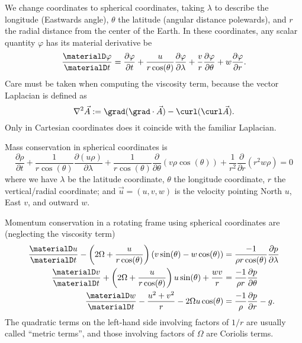 We change coordinates to spherical coordinates, taking $\lambda$ to
describe the longitude (Eastwards angle), $\theta$ the latitude (angular
distance polewards), and $r$ the radial distance from the center of the
Earth. In these coordinates, any scalar quantity $\varphi$ has its
material derivative be
\begin{equation}
  \frac{\materialD\varphi}{\materialD t}
  = \frac{\partial\varphi}{\partial t}
    + \frac{u}{r\cos(\theta)}\frac{\partial\varphi}{\partial\lambda}
    + \frac{v}{r}\frac{\partial\varphi}{\partial\theta}
    + w\frac{\partial\varphi}{\partial r}.
\end{equation}
Care must be taken when computing the viscosity term, because the vector
Laplacian is defined as
\begin{equation}
  \nabla^{2}\vec{A} := \grad(\grad\cdot\vec{A}) - \curl(\curl\vec{A}).
\end{equation}
Only in Cartesian coordinates does it coincide with the familiar Laplacian.

\begin{prop}
  Mass conservation in spherical coordinates is
  \begin{equation}
    \frac{\partial\rho}{\partial t}
    + \frac{1}{r\cos(\theta)}\frac{\partial(u\rho)}{\partial\lambda}
    + \frac{1}{r\cos(\theta)}\frac{\partial}{\partial\theta}(v\rho\cos(\theta))
    + \frac{1}{r^{2}}\frac{\partial}{\partial r}(r^{2}w\rho)
    = 0
  \end{equation}
  where we have $\lambda$ be the latitude coordinate, $\theta$ the
  longitude coordinate, $r$ the vertical/radial coordinate; and
  $\vec{u}=(u,v,w)$ is the velocity pointing North $u$, East $v$, and
  outward $w$.
\end{prop}

\begin{prop}
  Momentum conservation in a rotating frame using spherical coordinates
  are (neglecting the viscosity term)
  \begin{subequations}
    \begin{align}
      \frac{\materialD u}{\materialD t} -\left(2\Omega + \frac{u}{r\cos(\theta)}\right)(v\sin(\theta)-w\cos(\theta))
      &= \frac{-1}{\rho r\cos(\theta)}\frac{\partial p}{\partial\lambda}\\
      \frac{\materialD v}{\materialD t} +\left(2\Omega + \frac{u}{r\cos(\theta)}\right)u\sin(\theta)
      + \frac{wv}{r}
      &= \frac{-1}{\rho r}\frac{\partial p}{\partial\theta} \\
      \frac{\materialD w}{\materialD t} - \frac{u^{2}+v^{2}}{r} -
      2\Omega u\cos(\theta)
      &= \frac{-1}{\rho}\frac{\partial p}{\partial r}-g.\label{eq:vertical-rotating-momentum-conservation}
    \end{align}
  \end{subequations}
  The quadratic terms on the left-hand side involving factors of $1/r$
  are usually called ``metric terms'', and those involving factors of
  $\Omega$ are Coriolis terms.
\end{prop}

